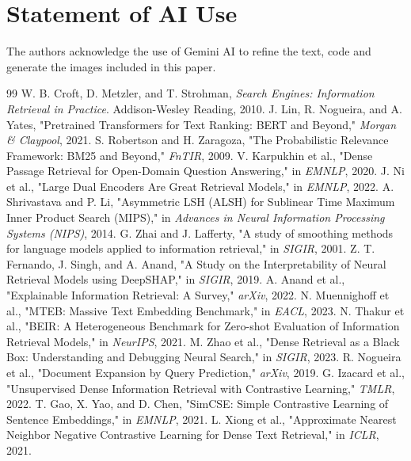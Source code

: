 \documentclass[sigconf,authordraft]{acmart}
\begin{document}
\section*{Statement of AI Use}
The authors acknowledge the use of Gemini AI to refine the text, code and generate the images included in this paper.

\begin{thebibliography}{99}
 W. B. Croft, D. Metzler, and T. Strohman, \textit{Search Engines: Information Retrieval in Practice}. Addison-Wesley Reading, 2010.
 J. Lin, R. Nogueira, and A. Yates, "Pretrained Transformers for Text Ranking: BERT and Beyond," \textit{Morgan \& Claypool}, 2021.
 S. Robertson and H. Zaragoza, "The Probabilistic Relevance Framework: BM25 and Beyond," \textit{FnTIR}, 2009.
 V. Karpukhin et al., "Dense Passage Retrieval for Open-Domain Question Answering," in \textit{EMNLP}, 2020.
 J. Ni et al., "Large Dual Encoders Are Great Retrieval Models," in \textit{EMNLP}, 2022.
 A. Shrivastava and P. Li, "Asymmetric LSH (ALSH) for Sublinear Time Maximum Inner Product Search (MIPS)," in \textit{Advances in Neural Information Processing Systems (NIPS)}, 2014.
 G. Zhai and J. Lafferty, "A study of smoothing methods for language models applied to information retrieval," in \textit{SIGIR}, 2001.
 Z. T. Fernando, J. Singh, and A. Anand, "A Study on the Interpretability of Neural Retrieval Models using DeepSHAP," in \textit{SIGIR}, 2019.
 A. Anand et al., "Explainable Information Retrieval: A Survey," \textit{arXiv}, 2022.
 N. Muennighoff et al., "MTEB: Massive Text Embedding Benchmark," in \textit{EACL}, 2023.
 N. Thakur et al., "BEIR: A Heterogeneous Benchmark for Zero-shot Evaluation of Information Retrieval Models," in \textit{NeurIPS}, 2021.
 M. Zhao et al., "Dense Retrieval as a Black Box: Understanding and Debugging Neural Search," in \textit{SIGIR}, 2023.
 R. Nogueira et al., "Document Expansion by Query Prediction," \textit{arXiv}, 2019.
 G. Izacard et al., "Unsupervised Dense Information Retrieval with Contrastive Learning," \textit{TMLR}, 2022.
 T. Gao, X. Yao, and D. Chen, "SimCSE: Simple Contrastive Learning of Sentence Embeddings," in \textit{EMNLP}, 2021.
 L. Xiong et al., "Approximate Nearest Neighbor Negative Contrastive Learning for Dense Text Retrieval," in \textit{ICLR}, 2021.

\end{thebibliography}
\end{document}
